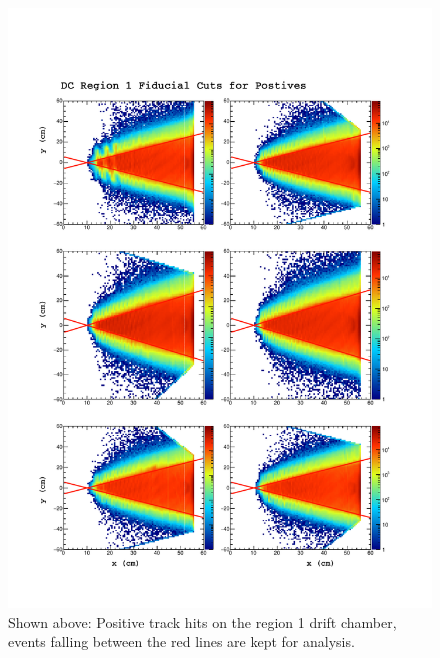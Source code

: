 \begin{figure}
 \label{fig:fid}
  \begin{center}
    \includegraphics[width=\columnwidth]{image/fid.pdf}
    \caption{Shown above: Positive track hits on the region 1 drift chamber, events falling between the red lines are kept for analysis.}
  \end{center}
\end{figure}

